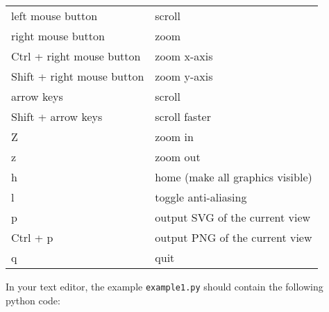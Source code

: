 \documentclass[12pt]{article}
\newcommand{\code}[1]{{\tt #1}}
\begin{document}
\vspace{.1in}
\begin{tabular}{ll}
    left mouse button          & scroll \\
    right mouse button         & zoom \\
    Ctrl + right mouse button  & zoom x-axis \\
    Shift + right mouse button & zoom y-axis \\
    arrow keys                 & scroll \\
    Shift + arrow keys         & scroll faster \\
    Z                          & zoom in \\
    z                          & zoom out \\
    h                          & home (make all graphics visible) \\
    l                          & toggle anti-aliasing \\
    p                          & output SVG of the current view \\
    Ctrl + p                   & output PNG of the current view \\
    q                          & quit \\
\end{tabular}
\vspace{.2in}



In your text editor, the example \code{example1.py} should contain the 
following python code:
\end{document}
